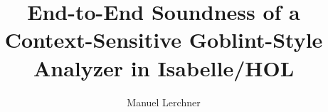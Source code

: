 \documentclass[a4paper,USenglish,cleveref,autoref,thm-restate]{lipics-v2021}
\title{End-to-End Soundness of a Context-Sensitive Goblint-Style Analyzer in Isabelle/HOL}
\author{Manuel Lerchner}{Technical University of Munich, Germany}{manuel.lerchner@tum.de}{}{}
\begin{document}
\maketitle















\label{paper:body-end}

\end{document}
